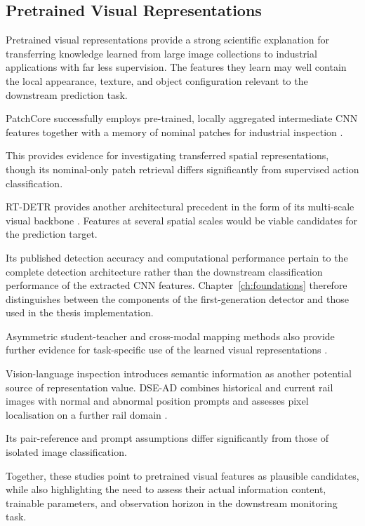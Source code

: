 \subsection{Pretrained Visual Representations}

Pretrained visual representations provide a strong scientific explanation for transferring knowledge
learned from large image collections to industrial applications with far less supervision. The
features they learn may well contain the local appearance, texture, and object configuration
relevant to the downstream prediction task.

PatchCore successfully employs pre-trained, locally aggregated intermediate CNN features together
with a memory of nominal patches for industrial inspection \citep[Section~3]{Roth2022Towards}.

This provides evidence for investigating transferred spatial representations, though its
nominal-only patch retrieval differs significantly from supervised action classification.

RT-DETR provides another architectural precedent in the form of its multi-scale visual backbone
\citep[Sections~4.1--4.2]{Zhao2024RTDETR}. Features at several spatial scales would be viable
candidates for the prediction target.

Its published detection accuracy and computational performance pertain to the complete detection
architecture rather than the downstream classification performance of the extracted CNN features.
Chapter~\ref{ch:foundations} therefore distinguishes between the components of the first-generation
detector and those used in the thesis implementation.

Asymmetric student-teacher and cross-modal mapping methods also provide further evidence for
task-specific use of the learned visual representations
\citep{Rudolph2023Asymmetric,Costanzino2024Multimodal}.

Vision-language inspection introduces semantic information as another potential source of
representation value. DSE-AD combines historical and current rail images with normal and abnormal
position prompts and assesses pixel localisation on a further rail domain \citep{P031}.

Its pair-reference and prompt assumptions differ significantly from those of isolated image
classification.

Together, these studies point to pretrained visual features as plausible candidates, while also
highlighting the need to assess their actual information content, trainable parameters, and
observation horizon in the downstream monitoring task.

